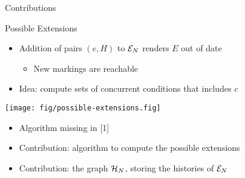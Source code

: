\documentclass[table,red,11pt]{beamer}
\begin{document}
\begin{frame}
\centerline{\LARGE Contributions}
\end{frame}

\begin{frame}{Possible Extensions}

\begin{itemize}
\item Addition of pairs $(e, H)$ to $\mathcal{E}_{N}$ renders $E$ out of date
\begin{itemize}
\item New markings are reachable
\end{itemize}
\item Idea: compute sets of \alert{concurrent conditions} that includes $c$
\end{itemize}

\centerline{\texttt{[image: fig/possible-extensions.fig]}}

\begin{itemize}
\item Algorithm missing in [1]
\item Contribution: \alert{algorithm} to compute the possible extensions
\item Contribution: the \alert{graph $\mathcal{H}_{N}$}, storing the histories of $\mathcal{E}_{N}$
\end{itemize}

\end{frame}
\end{document}
